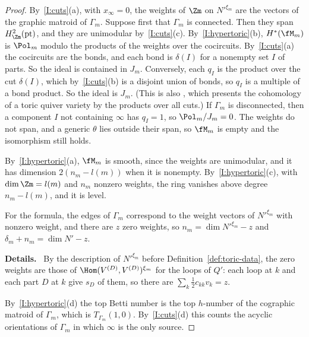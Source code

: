 \documentclass[11pt]{amsart}
\newenvironment{details}{\par\color{black!60!green}\noindent\textbf{Details.}\ }{\par}
\begin{document}
\begin{proof}
By~\ref{I:cuts}(a), with $x_\infty=0$, the weights of $\Zm$ on $N'^{\xi_m}$ are
the vectors of the graphic matroid of $\Gamma_m$.  Suppose first that $\Gamma_m$
is connected.  Then they span $H^2_{\Zm}(\mathrm{pt})$, and they are unimodular
by~\ref{I:cuts}(c).  By~\ref{I:hypertoric}(b), $H^*(\fM_m)$ is $\Pol_m$ modulo the
products of the weights over the cocircuits.  By~\ref{I:cuts}(a) the cocircuits
are the bonds, and each bond is $\delta(I)$ for a nonempty set $I$ of parts.  So
the ideal is contained in $J_m$.  Conversely, each $q_I$ is the product over the
cut $\delta(I)$, which by~\ref{I:cuts}(b) is a disjoint union of bonds, so
$q_I$ is a multiple of a bond product.  So the ideal is $J_m$.  (This is also
\cite[Thm.~8.3]{hauselToricHyperKahler2002}, which presents the cohomology of a
toric quiver variety by the products over all cuts.)  If $\Gamma_m$ is
disconnected, then a component $I$ not containing $\infty$ has $q_I=1$, so
$\Pol_m/J_m=0$.  The weights do not span, and a generic $\theta$ lies outside
their span, so $\fM_m$ is empty and the isomorphism still holds.

By~\ref{I:hypertoric}(a), $\fM_m$ is smooth, since the weights are
unimodular, and it has dimension $2(n_m-l(m))$ when it is nonempty.
By~\ref{I:hypertoric}(c), with $\dim\Zm=l(m)$ and $n_m$ nonzero weights, the
ring vanishes above degree $n_m-l(m)$, and it is level.

For the formula, the edges of $\Gamma_m$ correspond to the weight vectors of
$N'^{\xi_m}$ with nonzero weight, and there are $z$ zero weights, so
$n_m=\dim N'^{\xi_m}-z$ and $\delta_m+n_m=\dim N'-z$.
\begin{details}
By the description of $N'^{\xi_m}$
before Definition~\ref{def:toric-data}, the zero weights are those of
$\Hom(V^{(D)},V^{(D)})^{\xi_m}$ for the loops of $Q'$: each loop at $k$ and
each part $D$ at $k$ give $s_D$ of them, so there are $\sum_k\frac12c_{kk}v_k=z$.
\end{details}
By~\ref{I:hypertoric}(d) the top Betti number
is the top $h$-number of the cographic matroid of $\Gamma_m$, which is
$T_{\Gamma_m}(1,0)$.
By~\ref{I:cuts}(d) this counts the acyclic orientations of $\Gamma_m$ in which
$\infty$ is the only source.
\end{proof}
\end{document}
